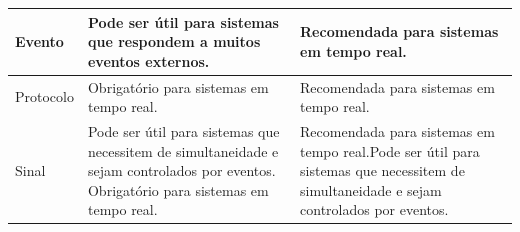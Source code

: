 \begin{longtable}{||p{3cm}|p{5cm}|p{5cm}||}
Evento                                             & Pode ser útil para sistemas que respondem a muitos eventos externos.                                                                                                                                                                                                                                                                                                                                              & Recomendada para sistemas em tempo real.                                                                                                                                                                                                                                                                                                                                         \\ \hline
Protocolo                                          & Obrigatório para sistemas em tempo real.                                                                                                                                                                                                                                                                                                                                                                          & Recomendada para sistemas em tempo real.                                                                                                                                                                                                                                                                                                                                         \\ \hline
Sinal                                              & Pode ser útil para sistemas que necessitem de simultaneidade e sejam controlados por eventos. Obrigatório para sistemas em tempo real.                                                                                                                                                                                                                                                                            & Recomendada para sistemas em tempo real.Pode ser útil para sistemas que necessitem de simultaneidade e sejam controlados por eventos.                                                                                                                                                                                                                                            \\ \hline

\end{longtable}

